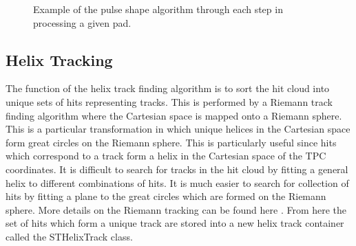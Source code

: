 \begin{figure}[!htb]%
    \centering
    \qquad

  	\caption{Example of the pulse shape algorithm through each step in processing a given pad. }
	\label{fig:psaTask}
\end{figure}


\subsection{Helix Tracking}
\label{sec:helixtrack}

 The function of the  helix track finding algorithm is to sort the hit cloud into unique sets of hits representing tracks. This is performed by a Riemann track finding algorithm where the Cartesian space is mapped onto a Riemann sphere. This is a particular transformation in which unique helices in the Cartesian space form great circles on the Riemann sphere. This is particularly useful since hits which correspond to a track form a helix in the Cartesian space of the TPC coordinates. It is difficult to search for tracks in the hit cloud by fitting a general helix to different combinations of hits. It is much easier to search for collection of hits by fitting a plane to the great circles which are formed on the Riemann sphere. More details on the Riemann tracking can be found here \cite{spiritroot_paper}. From here the set of hits which form a unique track are stored into a new helix track container called the STHelixTrack class. 
 

